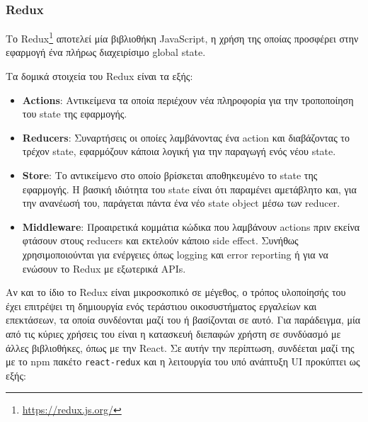 \subsubsection{Redux} \label{subsection:4-2-2-2-redux}


Το Redux\footnote{\url{https://redux.js.org/}} αποτελεί μία βιβλιοθήκη JavaScript, η χρήση της οποίας προσφέρει στην εφαρμογή ένα πλήρως διαχειρίσιμο global state.

Τα δομικά στοιχεία του Redux είναι τα εξής:
\begin{itemize}
	\item \textbf{Actions}: Αντικείμενα τα οποία περιέχουν νέα πληροφορία για την τροποποίηση του state της εφαρμογής.
	\item \textbf{Reducers}: Συναρτήσεις οι οποίες λαμβάνοντας ένα action και διαβάζοντας το τρέχον state, εφαρμόζουν κάποια λογική για την παραγωγή ενός νέου state.
	\item \textbf{Store}: Το αντικείμενο στο οποίο βρίσκεται αποθηκευμένο το state της εφαρμογής. Η βασική ιδιότητα του state είναι ότι παραμένει αμετάβλητο και, για την ανανέωσή του, παράγεται πάντα ένα νέο state object μέσω των reducer.
	\item \textbf{Middleware}: Προαιρετικά κομμάτια κώδικα που λαμβάνουν actions πριν εκείνα φτάσουν στους reducers και εκτελούν κάποιο side effect. Συνήθως χρησιμοποιούνται για ενέργειες όπως logging και error reporting ή για να ενώσουν το Redux με εξωτερικά APIs. 
\end{itemize}

Αν και το ίδιο το Redux είναι μικροσκοπικό σε μέγεθος, ο τρόπος υλοποίησής του έχει επιτρέψει τη δημιουργία ενός τεράστιου οικοσυστήματος εργαλείων και επεκτάσεων, τα οποία συνδέονται μαζί του ή βασίζονται σε αυτό. Για παράδειγμα, μία από τις κύριες χρήσεις του είναι η κατασκευή διεπαφών χρήστη σε συνδύασμό με άλλες βιβλιοθήκες, όπως με την React. Σε αυτήν την περίπτωση, συνδέεται μαζί της με το npm πακέτο \texttt{react-redux} και η λειτουργία του υπό ανάπτυξη UI προκύπτει ως εξής:

